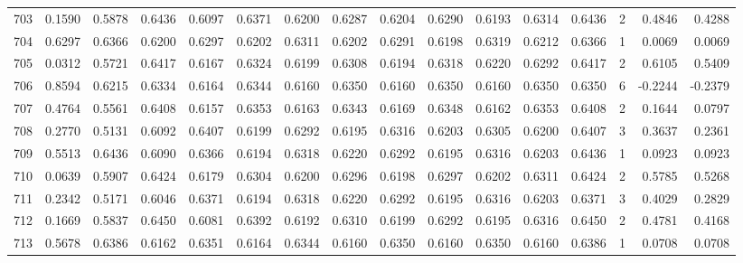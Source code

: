\begin{tabular}{lrrrrrrrrrrrrrrr}
703 &      0.1590 &  0.5878 &  0.6436 &  0.6097 &  0.6371 &  0.6200 &  0.6287 &  0.6204 &  0.6290 &  0.6193 &   0.6314 &     0.6436 &      2 &                    0.4846 &                     0.4288 \\
704 &      0.6297 &  0.6366 &  0.6200 &  0.6297 &  0.6202 &  0.6311 &  0.6202 &  0.6291 &  0.6198 &  0.6319 &   0.6212 &     0.6366 &      1 &                    0.0069 &                     0.0069 \\
705 &      0.0312 &  0.5721 &  0.6417 &  0.6167 &  0.6324 &  0.6199 &  0.6308 &  0.6194 &  0.6318 &  0.6220 &   0.6292 &     0.6417 &      2 &                    0.6105 &                     0.5409 \\
706 &      0.8594 &  0.6215 &  0.6334 &  0.6164 &  0.6344 &  0.6160 &  0.6350 &  0.6160 &  0.6350 &  0.6160 &   0.6350 &     0.6350 &      6 &                   -0.2244 &                    -0.2379 \\
707 &      0.4764 &  0.5561 &  0.6408 &  0.6157 &  0.6353 &  0.6163 &  0.6343 &  0.6169 &  0.6348 &  0.6162 &   0.6353 &     0.6408 &      2 &                    0.1644 &                     0.0797 \\
708 &      0.2770 &  0.5131 &  0.6092 &  0.6407 &  0.6199 &  0.6292 &  0.6195 &  0.6316 &  0.6203 &  0.6305 &   0.6200 &     0.6407 &      3 &                    0.3637 &                     0.2361 \\
709 &      0.5513 &  0.6436 &  0.6090 &  0.6366 &  0.6194 &  0.6318 &  0.6220 &  0.6292 &  0.6195 &  0.6316 &   0.6203 &     0.6436 &      1 &                    0.0923 &                     0.0923 \\
710 &      0.0639 &  0.5907 &  0.6424 &  0.6179 &  0.6304 &  0.6200 &  0.6296 &  0.6198 &  0.6297 &  0.6202 &   0.6311 &     0.6424 &      2 &                    0.5785 &                     0.5268 \\
711 &      0.2342 &  0.5171 &  0.6046 &  0.6371 &  0.6194 &  0.6318 &  0.6220 &  0.6292 &  0.6195 &  0.6316 &   0.6203 &     0.6371 &      3 &                    0.4029 &                     0.2829 \\
712 &      0.1669 &  0.5837 &  0.6450 &  0.6081 &  0.6392 &  0.6192 &  0.6310 &  0.6199 &  0.6292 &  0.6195 &   0.6316 &     0.6450 &      2 &                    0.4781 &                     0.4168 \\
713 &      0.5678 &  0.6386 &  0.6162 &  0.6351 &  0.6164 &  0.6344 &  0.6160 &  0.6350 &  0.6160 &  0.6350 &   0.6160 &     0.6386 &      1 &                    0.0708 &                     0.0708 \\

\end{tabular}
